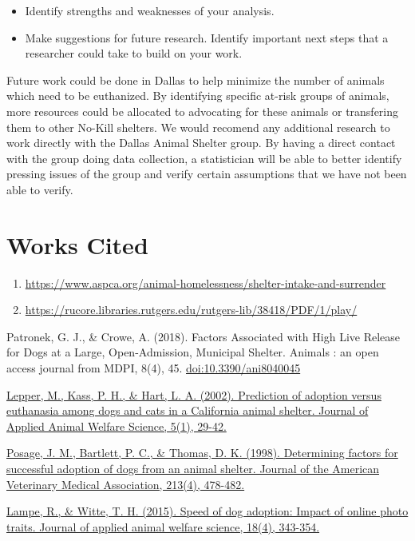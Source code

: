 \documentclass[]{article}
\providecommand{\tightlist}{%
  \setlength{\itemsep}{0pt}\setlength{\parskip}{0pt}}
\begin{document}
\begin{itemize}
\item
  Identify strengths and weaknesses of your analysis.
\item
  Make suggestions for future research. Identify important next steps
  that a researcher could take to build on your work.
\end{itemize}

Future work could be done in Dallas to help minimize the number of
animals which need to be euthanized. By identifying specific at-risk
groups of animals, more resources could be allocated to advocating for
these animals or transfering them to other No-Kill shelters. We would
recomend any additional research to work directly with the Dallas Animal
Shelter group. By having a direct contact with the group doing data
collection, a statistician will be able to better identify pressing
issues of the group and verify certain assumptions that we have not been
able to verify.

\section{Works Cited}\label{works-cited}

\begin{enumerate}
\def\labelenumi{\arabic{enumi}.}
\tightlist
\item
  \url{https://www.aspca.org/animal-homelessness/shelter-intake-and-surrender}
\item
  \url{https://rucore.libraries.rutgers.edu/rutgers-lib/38418/PDF/1/play/}
\end{enumerate}

Patronek, G. J., \& Crowe, A. (2018). Factors Associated with High Live
Release for Dogs at a Large, Open-Admission, Municipal Shelter. Animals
: an open access journal from MDPI, 8(4), 45.
\url{doi:10.3390/ani8040045}

\href{https://www.tandfonline.com/doi/abs/10.1207/S15327604JAWS0501_3}{Lepper,
M., Kass, P. H., \& Hart, L. A. (2002). Prediction of adoption versus
euthanasia among dogs and cats in a California animal shelter. Journal
of Applied Animal Welfare Science, 5(1), 29-42.}

\href{https://europepmc.org/abstract/med/9713528}{Posage, J. M.,
Bartlett, P. C., \& Thomas, D. K. (1998). Determining factors for
successful adoption of dogs from an animal shelter. Journal of the
American Veterinary Medical Association, 213(4), 478-482.}

\href{https://www.tandfonline.com/doi/abs/10.1080/10888705.2014.982796}{Lampe,
R., \& Witte, T. H. (2015). Speed of dog adoption: Impact of online
photo traits. Journal of applied animal welfare science, 18(4),
343-354.}
\end{document}
